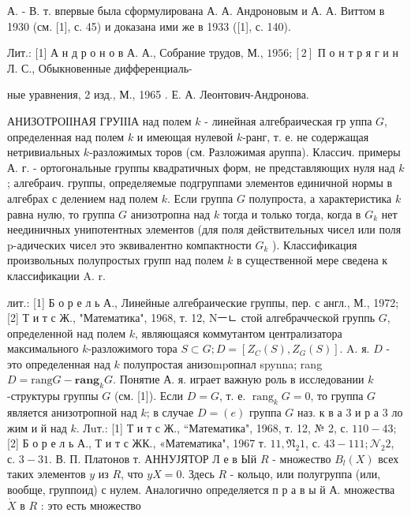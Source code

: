 \documentclass[10pt]{article}
\begin{document}
А. - В. т. впервые была сформулирована А. А. Андроновым и А. А. Виттом в 1930 (см. [1], с. 45) и доказана ими же в 1933 ([1], с. 140).



Лит.: [1] А н д р о н о в А. А., Собрание трудов, М., $1956 ;[2]$ П о н т р я г и н Л. С., Обыкновенные дифференциаль-

ные уравнения, 2 изд., М., 1965 . Е. А. Леонтович-Андронова.



АНИЗОТРОІІНАЯ ГРУІІІА над полем $k$ - линейная алгебраическая гр уппа $G$, определенная над полем $k$ и имеющая нулевой $k$-ранг, т. е. не содержащая нетривиальных $k$-разложимых торов (см. Разложимая аруппа). Классич. примеры А. г. - ортогональные группы квадратичных форм, не представляющих нуля над $k$; алгебраич. группы, определяемые подгруппами элементов единичной нормы в алгебрах с делением над полем $k$. Если группа $G$ полупроста, а характеристика $k$ равна нулю, то группа $G$ анизотропна над $k$ тогда и только тогда, когда в $G_{k}$ нет неединичных унипотентных элементов (для поля действительных чисел или поля p-адических чисел это эквивалентно компактности $G_{k}$ ). Классификация произвольных полупростых групп над полем $k$ в существенной мере сведена к классификации A. r.



лит.: [1] Б о р е л ь А., Линейные алгебраические группы, пер. с англ., М., 1972; [2] Т и т с Ж., "Математика", 1968, т. 12, Nㅡㄴ стой алгебрачческой группь $G$, определенной над полем $k$, являющаяся коммутантом централизатора максимального $k$-разложимого тора $S \subset G ; D=\left[Z_{C}(S), Z_{G}(S)\right]$. A. я. $D$ - это определенная над $k$ полупростая анизоmpопнал spynna; rang $D=\mathrm{rang} G-\mathbf{r a n g}_{k} G$. Понятие А. я. играет важную роль в исследовании $k$-структуры группы $G$ (см. [1]). Если $D=G$, т. е. $\operatorname{rang}_{k} G=0$, то группа $G$ является анизотропной над $k$; в случае $D=(e)$ группа $G$ наз. к в а 3 и р а 3 ло жим и й над $k$. Лuт.: [1] Т и т с Ж., “Математика", 1968, т. 12, № 2, с. $110-43 ;$ [2] Б о р е л ь А., Т и т с ЖК., «Математика", 1967 т. $11, \mathfrak{N}_{2} 1$, с. $43-111 ; \mathcal{N}_{2} 2$, с. $3-31$. В. П. Платонов т. АННУЈЯТОР Л е в Ый $R$ - множество $B_{l}(X)$ всех таких элементов $y$ из $R$, что $y X=0$. Здесь $R$ - кольцо, или полугруппа (или, вообще, группоид) с нулем. Аналогично определяется п р а в ы й А. множества $\dot{X}$ в $R$ : это есть множество
\end{document}
